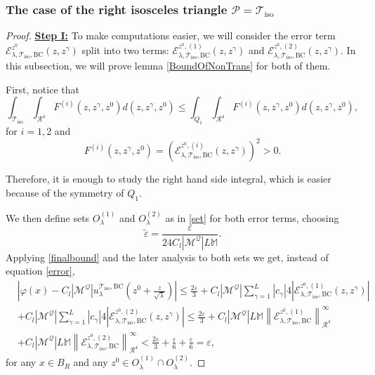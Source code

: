 \documentclass{amsart}
\theoremstyle{definition}
\theoremstyle{remark}
\newcommand{\ep}{\varepsilon}
\newcommand{\vp}{\varphi}
\renewcommand\leq\leqslant
\numberwithin{equation}{section}
\theoremstyle{definition}
\theoremstyle{remark}
\begin{document}
\subsubsection{The case of the right isosceles triangle $\mathcal{P}=\mathcal{T}_\mathrm{iso}$}
\begin{proof}
\textbf{	\underline{Step I:}}	To make computations easier, we will consider the error term $\mathcal{E}_{\lambda,\mathcal{T}_\mathrm{iso},\mathrm{BC}}^{z^0}(z,z^\gamma)$ split into two terms: $\mathcal{E}_{\lambda,\mathcal{T}_\mathrm{iso},\mathrm{BC}}^{z^0, (1)}(z,z^\gamma)$ and $\mathcal{E}_{\lambda,\mathcal{T}_\mathrm{iso},\mathrm{BC}}^{z^0, (2)}(z,z^\gamma)$. In this subsection, we will prove lemma \ref{BoundOfNonTrans} for both of them. 
	
	First, notice that
		\begin{equation}
		\int_{\mathcal{T}_\mathrm{iso}}\int_{\mathcal{R}^{4}}F^{(i)}(z,z^\gamma,z^0)d(z,z^\gamma,z^0)\leq	\int_{Q_1}\int_{\mathcal{R}^{4}}F^{(i)}(z,z^\gamma,z^0)d(z,z^\gamma,z^0),
	\end{equation} for $i=1,2$ and \begin{equation}F^{(i)}(z,z^\gamma,z^0)=\left(\mathcal{E}_{\lambda,\mathcal{T}_\mathrm{iso},\mathrm{BC}}^{z^0,(i)}(z,z^\gamma)\right)^2>0.\end{equation} 
	
	 Therefore, it is enough to study the right hand side integral, which is easier because of the symmetry of $Q_1$.
	
	We then	define sets   $O_\lambda^{(1)}$ and $O_\lambda^{(2)}$ as in \eqref{set} for both error terms, choosing  \begin{equation}
		\tilde{\ep}=\frac{\ep}{24C_l|\mathcal{M}^\mathcal{Q}|L\mathbb{M}}.
	\end{equation} Applying \ref{finalbound} and the later analysis to both sets we get, instead of equation \eqref{error}, 
	\begin{equation}
		\begin{aligned}
			&	\left|	\vp(x)-	C_l|\mathcal{M}^\mathcal{Q}|u_\lambda^{\mathcal{T}_\mathrm{iso},\mathrm{BC}}\left(z^0+\frac{z}{\sqrt{\lambda}}\right)\right|\leq\frac{2\ep}{3}+	C_l|\mathcal{M}^\mathcal{Q}|\sum_{\gamma=1}^{L}|c_\gamma|4\left|\mathcal{E}_{\lambda,\mathcal{T}_\mathrm{iso},\mathrm{BC}}^{z^0,(1)}(z,z^\gamma)\right|\\
			&+C_l|\mathcal{M}^\mathcal{Q}|\sum_{\gamma=1}^{L}|c_\gamma|4\left|\mathcal{E}_{\lambda,\mathcal{T}_\mathrm{iso},\mathrm{BC}}^{z^0,(2)}(z,z^\gamma)\right|\leq\frac{2\ep}{3}+	C_l|\mathcal{M}^\mathcal{Q}|L\mathbb{M}\left\|\mathcal{E}_{\lambda,\mathcal{T}_\mathrm{iso},\mathrm{BC}}^{z^0,(1)}\right\|_{\mathcal{R}^{4}}^{\infty}\\&+C_l|\mathcal{M}^\mathcal{Q}|L\mathbb{M}\left\|\mathcal{E}_{\lambda,\mathcal{T}_\mathrm{iso},\mathrm{BC}}^{z^0,(2)}\right\|_{\mathcal{R}^{4}}^{\infty}<\frac{2\ep}{3}+\frac{\ep}{6}+\frac{\ep}{6}=\ep,
		\end{aligned}
	\end{equation}
	for any $x\in B_R$ and any $z^0\in O_\lambda^{(1)}\cap O_\lambda^{(2)}$. 
	

\end{proof}
\end{document}

